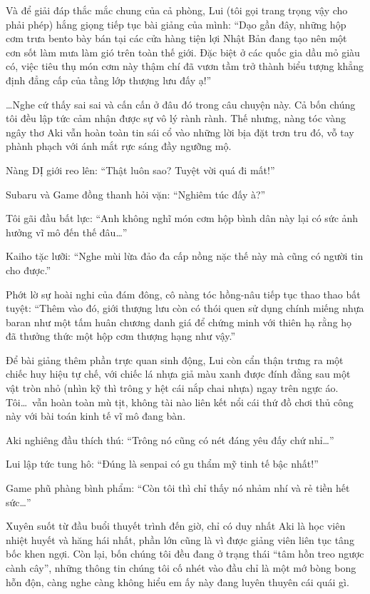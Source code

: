 \documentclass[../main.tex]{subfiles}
\begin{document}
Và để giải đáp thắc mắc chung của cả phòng, Lui (tôi gọi trang trọng vậy cho phải phép) hắng giọng tiếp tục bài giảng của mình: ``Dạo gần đây, những hộp cơm trưa bento bày bán tại các cửa hàng tiện lợi Nhật Bản đang tạo nên một cơn sốt làm mưa làm gió trên toàn thế giới. Đặc biệt ở các quốc gia dầu mỏ giàu có, việc tiêu thụ món cơm này thậm chí đã vươn tầm trở thành biểu tượng khẳng định đẳng cấp của tầng lớp thượng lưu đấy ạ!''


\dots Nghe cứ thấy sai sai và cấn cấn ở đâu đó trong câu chuyện này. Cả bốn chúng tôi đều lập tức cảm nhận được sự vô lý rành rành. Thế nhưng, nàng tóc vàng ngây thơ Aki vẫn hoàn toàn tin sái cổ vào những lời bịa đặt trơn tru đó, vỗ tay phành phạch với ánh mắt rực sáng đầy ngưỡng mộ.

Nàng DỊ giới reo lên: ``Thật luôn sao? Tuyệt vời quá đi mất!''

Subaru và Game đồng thanh hỏi vặn: ``Nghiêm túc đấy à?''

Tôi gãi đầu bất lực: ``Anh không nghĩ món cơm hộp bình dân này lại có sức ảnh hưởng vĩ mô đến thế đâu\dots''

Kaiho tặc lưỡi: ``Nghe mùi lừa đảo đa cấp nồng nặc thế này mà cũng có người tin cho được.''

Phớt lờ sự hoài nghi của đám đông, cô nàng tóc hồng-nâu tiếp tục thao thao bất tuyệt: ``Thêm vào đó, giới thượng lưu còn có thói quen sử dụng chính miếng nhựa baran như một tấm huân chương danh giá để chứng minh với thiên hạ rằng họ đã thưởng thức một hộp cơm thượng hạng như vậy.''

Để bài giảng thêm phần trực quan sinh động, Lui còn cẩn thận trưng ra một chiếc huy hiệu tự chế, với chiếc lá nhựa giả màu xanh được đính đằng sau một vật tròn nhỏ (nhìn kỹ thì trông y hệt cái nắp chai nhựa) ngay trên ngực áo. Tôi\dots\ vẫn hoàn toàn mù tịt, không tài nào liên kết nổi cái thứ đồ chơi thủ công này với bài toán kinh tế vĩ mô đang bàn.

Aki nghiêng đầu thích thú: ``Trông nó cũng có nét đáng yêu đấy chứ nhỉ\dots''

Lui lập tức tung hô: ``Đúng là senpai có gu thẩm mỹ tinh tế bậc nhất!''

Game phũ phàng bình phẩm: ``Còn tôi thì chỉ thấy nó nhảm nhí và rẻ tiền hết sức\dots''

Xuyên suốt từ đầu buổi thuyết trình đến giờ, chỉ có duy nhất Aki là học viên nhiệt huyết và hăng hái nhất, phần lớn cũng là vì được giảng viên liên tục tâng bốc khen ngợi. Còn lại, bốn chúng tôi đều đang ở trạng thái ``tâm hồn treo ngược cành cây'', những thông tin chúng tôi cố nhét vào đầu chỉ là một mớ bòng bong hỗn độn, càng nghe càng không hiểu em ấy này đang luyên thuyên cái quái gì.
\end{document}
